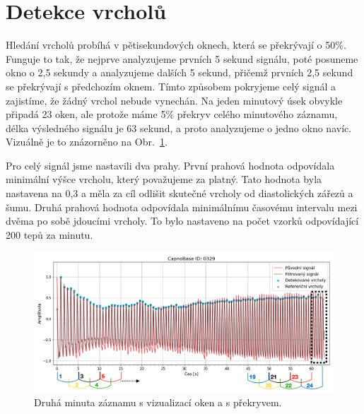 \section{Detekce vrcholů}
\label{sec:alg_peaks}
Hledání vrcholů probíhá v pětisekundových oknech, která se překrývají o 50\%.
Funguje to tak, že nejprve analyzujeme prvních 5 sekund signálu, poté posuneme okno o 2,5 sekundy a analyzujeme dalších 5 sekund, přičemž prvních 2,5 sekund se překrývají s předchozím oknem.
Tímto způsobem pokryjeme celý signál a zajistíme, že žádný vrchol nebude vynechán.
Na jeden minutový úsek obvykle připadá 23 oken, ale protože máme 5\% překryv celého minutového záznamu, délka výsledného signálu je 63 sekund, a proto analyzujeme o jedno okno navíc.
Vizuálně je to znázorněno na Obr.~\ref{fig:my-detection}.

Pro celý signál jsme nastavili dva prahy.
První prahová hodnota odpovídala minimální výšce vrcholu, který považujeme za platný.
Tato hodnota byla nastavena na 0,3 a měla za cíl odlišit skutečné vrcholy od diastolických zářezů a šumu.
Druhá prahová hodnota odpovídala minimálnímu časovému intervalu mezi dvěma po sobě jdoucími vrcholy.
To bylo nastaveno na počet vzorků odpovídající 200 tepů za minutu.

\begin{figure} [h]
	\centering
	\includegraphics[width=1\textwidth]{./obrazky/My_peaks.png}
	\caption[Vlastní detekce vrcholů]{Druhá minuta záznamu s vizualizací oken a s překryvem.}
	\label{fig:my-detection}
\end{figure}

